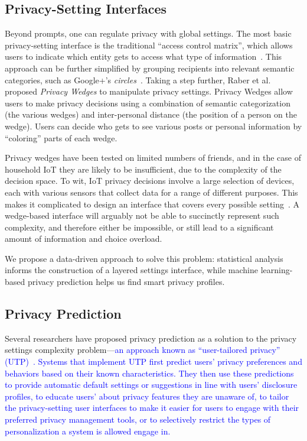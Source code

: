 \subsection{Privacy-Setting Interfaces}
Beyond prompts, one can regulate privacy with global settings. The most basic privacy-setting interface is the traditional ``access control matrix'', which allows users to indicate which entity gets to access what type of information~\cite{sandhu1994access}. This approach can be further simplified by grouping recipients into relevant semantic categories, such as Google+'s \emph{circles}~\cite{watson12}. Taking a step further, Raber et al.~\cite{197908} proposed \emph{Privacy Wedges} to manipulate privacy settings. Privacy Wedges allow users to make privacy decisions using a combination of semantic categorization (the various wedges) and inter-personal distance (the position of a person on the wedge). Users can decide who gets to see various posts or personal information by ``coloring'' parts of each wedge. 

Privacy wedges have been tested on limited numbers of friends, and in the case of household IoT they are likely to be insufficient, due to the complexity of the decision space. To wit, IoT privacy decisions involve a large selection of devices, each with various sensors that collect data for a range of different purposes. This makes it complicated to design an interface that covers every possible setting~\cite{williams2016perfect}. A wedge-based interface will arguably not be able to succinctly represent such complexity, and therefore either be impossible, or still lead to a significant amount of information and choice overload. 

We propose a data-driven approach to solve this problem: statistical analysis informs the construction of a layered settings interface, while machine learning-based privacy prediction helps us find smart privacy profiles.


\subsection{Privacy Prediction}
Several researchers have proposed privacy prediction as a solution to the privacy settings complexity problem---\textcolor{blue}{an approach known as ``user-tailored privacy'' (UTP)~\cite{knijnenburg2017}. Systems that implement UTP first predict users' privacy preferences and behaviors based on their known characteristics. They then use these predictions to provide automatic default settings or suggestions in line with users' disclosure profiles, to educate users' about privacy features they are unaware of, to tailor the privacy-setting user interfaces to make it easier for users to engage with their preferred privacy management tools, or to selectively restrict the types of personalization a system is allowed engage in.}

